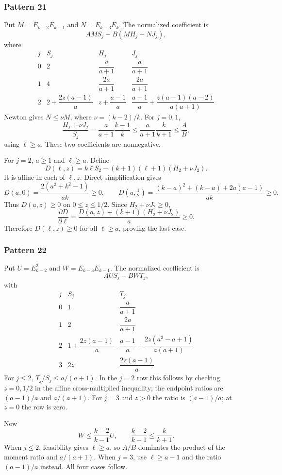 \documentclass[11pt,a4paper]{article}
\theoremstyle{remark}\newtheorem{remark}[theorem]{Remark}
\begin{document}
\subsubsection{Pattern 21}
Put $M=E_{k-2}E_{k-1}$ and $N=E_{k-3}E_k$. The normalized coefficient is
\[
 AM S_j-B(M H_j+N J_j),
\]
where
\[
\begin{array}{c|ccc}
 j&S_j&H_j&J_j\\\hline
0&2&\dfrac a{a+1}&\dfrac a{a+1}\\[5pt]
1&4&\dfrac{2a}{a+1}&\dfrac{2a}{a+1}\\[5pt]
2&2+\dfrac{2z(a-1)}a&z+\dfrac{a-1}a&
\dfrac{a-1}a+\dfrac{z(a-1)(a-2)}{a(a+1)}
\end{array}
\]
Newton gives $N\le\nu M$, where $\nu=(k-2)/k$. For $j=0,1$,
\[
 \frac{H_j+\nu J_j}{S_j}
 =\frac a{a+1}\frac{k-1}{k}
 \le\frac a{a+1}\frac k{k+1}\le\frac AB,
\]
using $\ell\ge a$. These two coefficients are nonnegative.

For $j=2$, $a\ge1$ and $\ell\ge a$. Define
\[
 D(\ell,z)=k\ell S_2-(k+1)(\ell+1)(H_2+\nu J_2).
\]
It is affine in each of $\ell,z$. Direct simplification gives
\[
 D(a,0)=\frac{2(a^2+k^2-1)}{ak}\ge0,
 \qquad
 D(a,\tfrac12)=\frac{(k-a)^2+(k-a)+2a(a-1)}{ak}\ge0.
\]
Thus $D(a,z)\ge0$ on $0\le z\le1/2$. Since $H_2+\nu J_2\ge0$,
\[
 \frac{\partial D}{\partial\ell}
 =\frac{D(a,z)+(k+1)(H_2+\nu J_2)}a\ge0.
\]
Therefore $D(\ell,z)\ge0$ for all $\ell\ge a$, proving the last case.

\subsubsection{Pattern 22}
Put $U=E_{k-2}^2$ and $W=E_{k-3}E_{k-1}$. The normalized coefficient is
\[
 AU S_j-BW T_j,
\]
with
\[
\begin{array}{c|cc}
 j&S_j&T_j\\\hline
0&1&\dfrac a{a+1}\\[5pt]
1&2&\dfrac{2a}{a+1}\\[5pt]
2&1+\dfrac{2z(a-1)}a&
\dfrac{a-1}a+\dfrac{2z(a^2-a+1)}{a(a+1)}\\[5pt]
3&2z&\dfrac{2z(a-1)}a
\end{array}
\]
For $j\le2$, $T_j/S_j\le a/(a+1)$. In the $j=2$ row this follows by checking $z=0,1/2$ in the affine cross-multiplied inequality; the endpoint ratios are $(a-1)/a$ and $a/(a+1)$. For $j=3$ and $z>0$ the ratio is $(a-1)/a$; at $z=0$ the row is zero.

Now
\[
 W\le\frac{k-2}{k-1}U,
 \qquad \frac{k-2}{k-1}\le\frac k{k+1}.
\]
When $j\le2$, feasibility gives $\ell\ge a$, so $A/B$ dominates the product of the moment ratio and $a/(a+1)$. When $j=3$, use $\ell\ge a-1$ and the ratio $(a-1)/a$ instead. All four cases follow.
\end{document}
